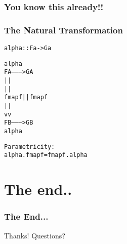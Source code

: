 \documentclass[12pt, xcolor=table]{beamer}
\begin{document}
\begin{comment}
Further examples

Maybe
-----
> data Maybe x = Just x | Nothing

> instance Functor Maybe where
>   fmap f (Just x) = Just (f x)
>   fmap f Nothing = Nothing


> fmap (++ "ho") (Just "hey")

Trees
-----
> data Tree x = Empty | Node x (Tree x) (Tree x)

> instance Functor Tree where
>   fmap f Empty = Empty
>   fmap f (Node x left right) = Node (f x) (fmap f left) (fmap f right)
\end{comment}

\begin{frame}
    \frametitle{You know this already!!}
\end{frame}

\begin{frame}
    \frametitle{The Natural Transformation}
\begin{alltt}
    alpha            ::  F a -> G a


               alpha\\
         F A ---------> G A\\
           |            |\\
           |            |\\
    fmap f |            | fmap f\\
           |            |\\
           v            v\\
         F B ---------> G B\\
               alpha


Parametricity:\\
alpha . fmap f    =  fmap f . alpha
\end{alltt}
\end{frame}


\section{The end..} %
\begin{frame}
    \frametitle{The End...}
    \begin{block}{Thanks!}
        Questions?
    \end{block}
\end{frame}
\end{document}

